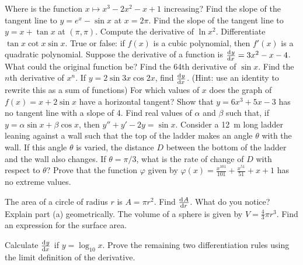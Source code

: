 \begin{questions}
  \questioA Where is the function $ x \mapsto x^3 - 2x^2 - x + 1 $ increasing?
  \questioA Find the slope of the tangent line to $ y = e^x - \sin x $ at $ x = 2\pi $.
  \questioA Find the slope of the tangent line to $ y = x + \tan x $ at $ (\pi, \pi) $.
  \questioA Compute the derivative of $ \ln x^2 $.
  \questioA Differentiate $ \tan x \cot x \sin x $.
  \questioA True or false: if $ f(x) $ is a cubic polynomial, then $ f'(x) $ is a quadratic polynomial.
  \questioA Suppose the derivative of a function is $ \od{y}{x} = 3x^2 - x - 4 $. What could the original function be?
  \questioM Find the 64th derivative of $ \sin x $.
  \questioM Find the $ n$th derivative of $ x^n $.
  \questioM If $ y = 2\sin 3x \cos 2x $, find $ \od{y}{x} $. (Hint: use an identity to rewrite this as a sum of functions)
  \questioM For which values of $ x $ does the graph of $ f(x) = x + 2\sin x $ have a horizontal tangent?
  \questioE Show that $ y = 6x^3 + 5x - 3 $ has no tangent line with a slope of 4.
  \questioE Find real values of $ \alpha $ and $ \beta $ such that, if $ y = \alpha \sin x + \beta \cos x $,
            then $ y'' + y' -2y = \sin x $.
  \questioE Consider a \SI{12}{\metre} long ladder leaning against a wall such that the top of the ladder makes an
            angle $ \theta $ with the wall. If this angle $ \theta $ is varied, the distance $ D $ between the bottom
            of the ladder and the wall also changes. If $ \theta = \pi/3 $, what is the rate of change of $ D $ with
            respect to $ \theta $?
  \questioE Prove that the function $ \varphi $ given by $ \varphi(x) = \frac{x^{101}}{101} + \frac{x^{51}}{51} + x + 1 $
            has no extreme values.
  \question
    \begin{parts}
      \parA The area of a circle of radius $ r $ is $ A = \pi r^2 $. Find $ \od{A}{r} $. What do you notice?
      \parM Explain part (a) geometrically.
      \parE The volume of a sphere is given by $ V = \frac{4}{3} \pi r^3 $. Find an expression for the surface area.
    \end{parts}
  \questioE Calculate $ \od{y}{x} $ if $ y = \log_{10} x $.
  \questioE Prove the remaining two differentiation rules using the limit definition of the derivative.
\end{questions}

